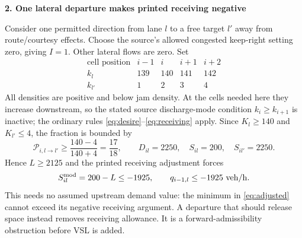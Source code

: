 \documentclass[10pt,a4paper]{article}
\newcommand{\head}[1]{\par\medskip\textbf{#1}\par}
\newcommand{\Prule}{\mathcal P}
\begin{document}
\head{2. One lateral departure makes printed receiving negative}
Consider one permitted direction from lane $l$ to a free target $l'$ away
from route/courtesy effects. Choose the source's allowed congested
keep-right setting zero, giving $I=1$. Other lateral flows are zero. Set
\[
\begin{array}{c|rrrr}
 \text{cell position}&i-1&i&i+1&i+2\\ \hline
 k_l&139&140&141&142\\
 k_{l'}&1&2&3&4
\end{array}
\]
All densities are positive and below jam density. At the cells needed here
they increase downstream, so the stated source discharge-mode condition
$k_i\geq k_{i+1}$ is inactive; the ordinary rules
\eqref{eq:desire}--\eqref{eq:receiving} apply. Since
$K_l\geq140$ and $K_{l'}\leq4$, the fraction is bounded by
\begin{equation}
 \Prule_{i,l\to l'}\geq\frac{140-4}{140+4}=\frac{17}{18},\qquad
 D_{il}=2250,\quad S_{il}=200,\quad S_{il'}=2250.
\end{equation}
Hence $L\geq2125$ and the printed receiving adjustment forces
\begin{equation}
 S^{\rm mod}_{il}=200-L\leq-1925,\qquad
 q_{i-1,l}\leq-1925\ {\rm veh/h}. \label{eq:negative}
\end{equation}
This needs no assumed upstream demand value: the minimum in
\eqref{eq:adjusted} cannot exceed its negative receiving argument. A
departure that should release space instead removes receiving allowance.
It is a forward-admissibility obstruction before VSL is added.
\end{document}
